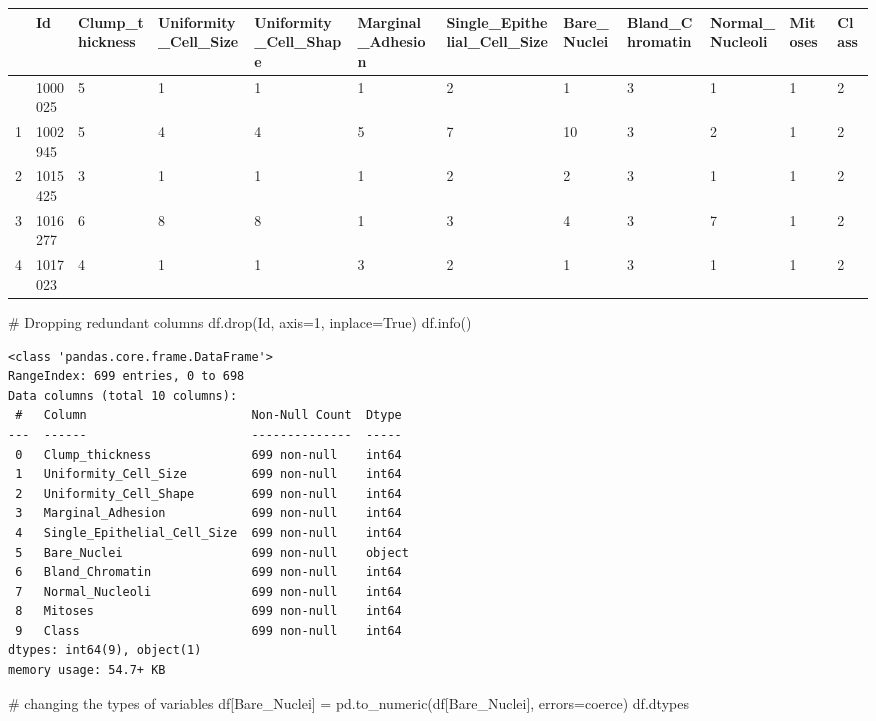 \documentclass[
  letterpaper,
  DIV=11,
  numbers=noendperiod]{scrreprt}
\newenvironment{Shaded}{\begin{snugshade}}{\end{snugshade}}
\newcommand{\CommentTok}[1]{\textcolor[rgb]{0.37,0.37,0.37}{#1}}
\newcommand{\DecValTok}[1]{\textcolor[rgb]{0.68,0.00,0.00}{#1}}
\newcommand{\NormalTok}[1]{\textcolor[rgb]{0.00,0.23,0.31}{#1}}
\newcommand{\OperatorTok}[1]{\textcolor[rgb]{0.37,0.37,0.37}{#1}}
\newcommand{\StringTok}[1]{\textcolor[rgb]{0.13,0.47,0.30}{#1}}
\newcommand{\VariableTok}[1]{\textcolor[rgb]{0.07,0.07,0.07}{#1}}
\newcounter{none} %
\begin{document}
{\def\LTcaptype{none} %
\begin{longtable}[]{@{}llllllllllll@{}}
\toprule\noalign{}
& Id & Clump\_thickness & Uniformity\_Cell\_Size &
Uniformity\_Cell\_Shape & Marginal\_Adhesion &
Single\_Epithelial\_Cell\_Size & Bare\_Nuclei & Bland\_Chromatin &
Normal\_Nucleoli & Mitoses & Class \\
\midrule\noalign{}
\endhead
\bottomrule\noalign{}
\endlastfoot
0 & 1000025 & 5 & 1 & 1 & 1 & 2 & 1 & 3 & 1 & 1 & 2 \\
1 & 1002945 & 5 & 4 & 4 & 5 & 7 & 10 & 3 & 2 & 1 & 2 \\
2 & 1015425 & 3 & 1 & 1 & 1 & 2 & 2 & 3 & 1 & 1 & 2 \\
3 & 1016277 & 6 & 8 & 8 & 1 & 3 & 4 & 3 & 7 & 1 & 2 \\
4 & 1017023 & 4 & 1 & 1 & 3 & 2 & 1 & 3 & 1 & 1 & 2 \\
\end{longtable}
}

\begin{Shaded}
\begin{Highlighting}[]
\CommentTok{\# Dropping redundant columns }
\NormalTok{df.drop(}\StringTok{\textquotesingle{}Id\textquotesingle{}}\NormalTok{, axis}\OperatorTok{=}\DecValTok{1}\NormalTok{, inplace}\OperatorTok{=}\VariableTok{True}\NormalTok{)}
\NormalTok{df.info()}
\end{Highlighting}
\end{Shaded}

\begin{verbatim}
<class 'pandas.core.frame.DataFrame'>
RangeIndex: 699 entries, 0 to 698
Data columns (total 10 columns):
 #   Column                       Non-Null Count  Dtype 
---  ------                       --------------  ----- 
 0   Clump_thickness              699 non-null    int64 
 1   Uniformity_Cell_Size         699 non-null    int64 
 2   Uniformity_Cell_Shape        699 non-null    int64 
 3   Marginal_Adhesion            699 non-null    int64 
 4   Single_Epithelial_Cell_Size  699 non-null    int64 
 5   Bare_Nuclei                  699 non-null    object
 6   Bland_Chromatin              699 non-null    int64 
 7   Normal_Nucleoli              699 non-null    int64 
 8   Mitoses                      699 non-null    int64 
 9   Class                        699 non-null    int64 
dtypes: int64(9), object(1)
memory usage: 54.7+ KB
\end{verbatim}

\begin{Shaded}
\begin{Highlighting}[]
\CommentTok{\# changing the types of variables }
\NormalTok{df[}\StringTok{\textquotesingle{}Bare\_Nuclei\textquotesingle{}}\NormalTok{] }\OperatorTok{=}\NormalTok{ pd.to\_numeric(df[}\StringTok{\textquotesingle{}Bare\_Nuclei\textquotesingle{}}\NormalTok{], errors}\OperatorTok{=}\StringTok{\textquotesingle{}coerce\textquotesingle{}}\NormalTok{)}
\NormalTok{df.dtypes}
\end{Highlighting}
\end{Shaded}
\end{document}
